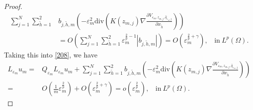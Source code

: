 \documentclass[10pt,a4paper]{amsart}
\begin{document}
\begin{proof}
\begin{equation*}
\begin{split}
\sum_{j=1}^N\sum_{\tilde{h}=1}^2&b_{j,\tilde{h},m}\left( -\varepsilon_m^2\text{div}\left (K(z_{m,j})\nabla   \frac{\partial V_{\varepsilon_m, z_{m,j},\hat{q}_{\varepsilon_m,j}}}{\partial x_{\tilde{h}}}\right )\right)\\
&=O\left( \sum_{j=1}^N\sum_{\tilde{h}=1}^2\varepsilon_m^{\frac{2}{p}-1}|b_{j,\tilde{h},m}|\right)
=O\left( \varepsilon_m^{\frac{2}{p}+\gamma}\right),\ \ \ \ \text{in}\ L^p(\Omega).
\end{split}
\end{equation*}
Taking this into \eqref{208}, we have
\begin{equation}\label{307}
\begin{split}
L_{\varepsilon_m} u_m=&Q_{\varepsilon_m} L_{\varepsilon_m} u_m+\sum_{j=1}^N\sum_{\tilde{h}=1}^2b_{j,\tilde{h},m}\left( -\varepsilon_m^2\text{div}\left (K(z_{m,j})\nabla   \frac{\partial V_{\varepsilon_m, z_{m,j},\hat{q}_{\varepsilon_m,j}}}{\partial x_{\tilde{h}}}\right )\right)\\
=&O\left( \frac{1}{m}\varepsilon_m^{\frac{2}{p}}\right) +O\left(  \varepsilon_m^{\frac{2}{p}+\gamma}\right)
=o\left( \varepsilon_m^{\frac{2}{p}}\right),\ \ \ \ \text{in}\ L^p(\Omega).
\end{split}
\end{equation}


\end{proof}
\end{document}
